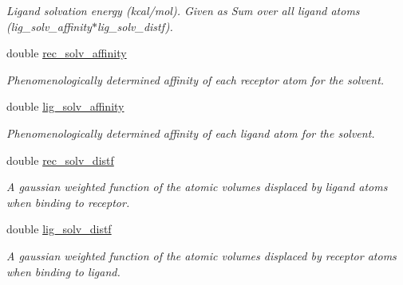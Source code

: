\begin{DoxyCompactItemize}
\begin{DoxyCompactList}\small\item\em Ligand solvation energy (kcal/mol). Given as Sum over all ligand atoms (lig\_\-solv\_\-affinity$\ast$lig\_\-solv\_\-distf). \item\end{DoxyCompactList}\item 
\hypertarget{classENERGY_a61cfed5d4be73c890c0f6b48fe6cff64}{
double \hyperlink{classENERGY_a61cfed5d4be73c890c0f6b48fe6cff64}{rec\_\-solv\_\-affinity}}
\label{classENERGY_a61cfed5d4be73c890c0f6b48fe6cff64}

\begin{DoxyCompactList}\small\item\em Phenomenologically determined affinity of each receptor atom for the solvent. \item\end{DoxyCompactList}\item 
\hypertarget{classENERGY_a4fc0db8e32ed2115a636b5b91f4b1ddd}{
double \hyperlink{classENERGY_a4fc0db8e32ed2115a636b5b91f4b1ddd}{lig\_\-solv\_\-affinity}}
\label{classENERGY_a4fc0db8e32ed2115a636b5b91f4b1ddd}

\begin{DoxyCompactList}\small\item\em Phenomenologically determined affinity of each ligand atom for the solvent. \item\end{DoxyCompactList}\item 
\hypertarget{classENERGY_aff96157428ab097046ca8b4d8074ef19}{
double \hyperlink{classENERGY_aff96157428ab097046ca8b4d8074ef19}{rec\_\-solv\_\-distf}}
\label{classENERGY_aff96157428ab097046ca8b4d8074ef19}

\begin{DoxyCompactList}\small\item\em A gaussian weighted function of the atomic volumes displaced by ligand atoms when binding to receptor. \item\end{DoxyCompactList}\item 
\hypertarget{classENERGY_afb87b01bdccf6af63d70bef97fe9021e}{
double \hyperlink{classENERGY_afb87b01bdccf6af63d70bef97fe9021e}{lig\_\-solv\_\-distf}}
\label{classENERGY_afb87b01bdccf6af63d70bef97fe9021e}

\begin{DoxyCompactList}\small\item\em A gaussian weighted function of the atomic volumes displaced by receptor atoms when binding to ligand. \item\end{DoxyCompactList}\end{DoxyCompactItemize}



